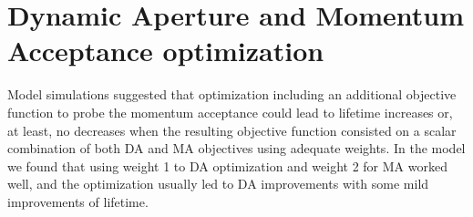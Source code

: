 \documentclass[a4paper,11pt]{article}
\begin{document}
\section{Dynamic Aperture and Momentum Acceptance optimization}
Model simulations suggested that optimization including an additional objective function to probe the momentum acceptance could lead to lifetime increases or, at least, no decreases when the resulting objective function consisted on a scalar combination of both DA and MA objectives using adequate weights. In the model we found that using weight 1 to DA optimization and weight 2 for MA worked well, and the optimization usually led to DA improvements with some mild improvements of lifetime. 
\end{document}
